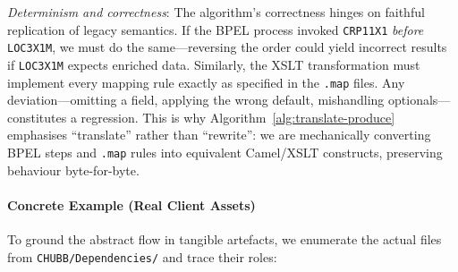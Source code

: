 \documentclass[11pt]{article}
\begin{document}
\noindent\emph{Determinism and correctness}: The algorithm's correctness hinges on faithful replication of legacy semantics. If the BPEL process invoked \texttt{CRP11X1} \emph{before} \texttt{LOC3X1M}, we must do the same—reversing the order could yield incorrect results if \texttt{LOC3X1M} expects enriched data. Similarly, the XSLT transformation must implement every mapping rule exactly as specified in the \texttt{.map} files. Any deviation—omitting a field, applying the wrong default, mishandling optionals—constitutes a regression. This is why Algorithm~\ref{alg:translate-produce} emphasises ``translate'' rather than ``rewrite'': we are mechanically converting BPEL steps and \texttt{.map} rules into equivalent Camel/XSLT constructs, preserving behaviour byte-for-byte.

\paragraph{Concrete Example (Real Client Assets)}

To ground the abstract flow in tangible artefacts, we enumerate the actual files from \texttt{CHUBB/Dependencies/} and trace their roles:
\end{document}
